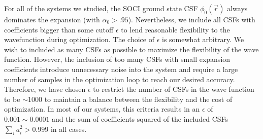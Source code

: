 \documentclass[aps,prl,superscriptaddress,groupedaddress]{revtex4}
\begin{document}
For all of the systems we studied, the SOCI ground state CSF $\phi_0(\vec{r})$ always dominates the expansion (with $\alpha_0>.95$). Nevertheless, we include all CSFs with coefficients bigger than some cutoff $\epsilon$ to lend reasonable flexibility to the wavefunction during optimization. The choice of $\epsilon$ is somewhat arbitrary. We wish to included as many CSFs as possible to maximize the flexibility of the wave function. However, the inclusion of too many CSFs with small expansion coefficients introduce unnecessary noise into the system and require a large number of samples in the optimization loop to reach our desired accuracy. Therefore, we have chosen $\epsilon$ to restrict the number of CSFs in the wave function to be $\sim$1000 to maintain a balance between the flexibility and the cost of optimization. In most of our systems, this criteria results in an $\epsilon$ of $0.001\sim0.0001$ and the sum of coefficients squared of the included CSFs $\sum\limits_{i}a_i^2 > 0.999$ in all cases.
\end{document}
